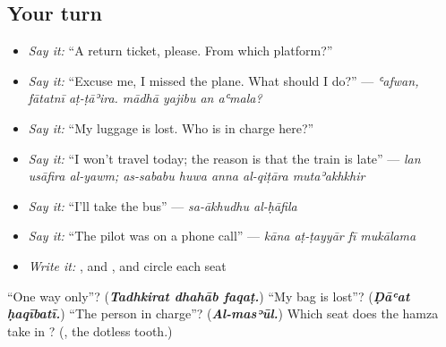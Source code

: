 \subsection*{Your turn}
\begin{itemize}
\raggedright
  \item \emph{Say it:} \textquotedblleft{}A return ticket, please. From which platform?\textquotedblright{}
  \item \emph{Say it:} \textquotedblleft{}Excuse me, I missed the plane. What should I do?\textquotedblright{} — \emph{ʿafwan, fātatnī aṭ-ṭāʾira. mādhā yajibu an aʿmala?}
  \item \emph{Say it:} \textquotedblleft{}My luggage is lost. Who is in charge here?\textquotedblright{}
  \item \emph{Say it:} \textquotedblleft{}I won't travel today; the reason is that the train is late\textquotedblright{} — \emph{lan usāfira al-yawm; as-sababu huwa anna al-qiṭāra mutaʾakhkhir}
  \item \emph{Say it:} \textquotedblleft{}I'll take the bus\textquotedblright{} — \emph{sa-ākhudhu al-ḥāfila}
  \item \emph{Say it:} \textquotedblleft{}The pilot was on a phone call\textquotedblright{} — \emph{kāna aṭ-ṭayyār fī mukālama}
  \item \emph{Write it:} \textbf{}, \textbf{} and \textbf{}, and circle each seat
\end{itemize}

\begin{tcolorbox}[breakable,colback=teal!4,colframe=teal!35!black,title={Before you move on}]
\textquotedblleft{}One way only\textquotedblright{}? (\emph{\textbf{Tadhkirat dhahāb faqaṭ.}}) \textquotedblleft{}My bag is lost\textquotedblright{}? (\emph{\textbf{Ḍāʿat ḥaqībatī.}}) \textquotedblleft{}The person in charge\textquotedblright{}? (\emph{\textbf{Al-masʾūl.}}) Which seat does the hamza take in \textbf{}? (\textbf{}, the dotless tooth.)
\end{tcolorbox}
